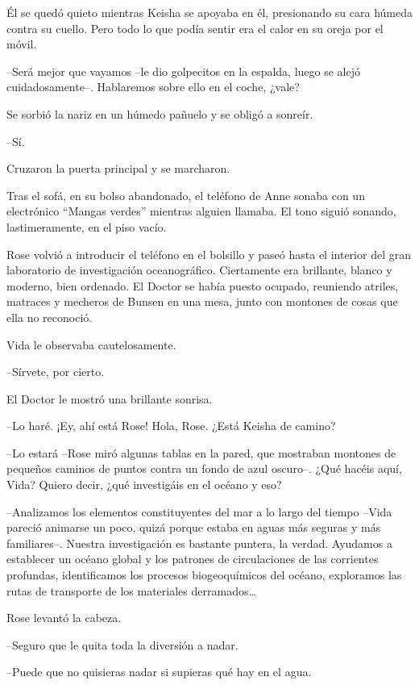 {Él se quedó quieto mientras Keisha se apoyaba en él, presionando su
 cara húmeda contra su cuello. Pero todo lo que podía sentir era el calor
en su oreja por el móvil.}

{--Será mejor que vayamos --le dio golpecitos en la espalda, luego se
alejó cuidadosamente--. Hablaremos sobre ello en el coche, ¿vale?}

{Se sorbió la nariz en un húmedo pañuelo y se obligó a sonreír.}

{--Sí.}

{Cruzaron la puerta principal y se marcharon.}

{Tras el sofá, en su bolso abandonado, el teléfono de Anne sonaba con un
 electrónico ``Mangas verdes'' mientras alguien llamaba. El tono siguió
sonando, lastimeramente, en el piso vacío.}

\mbox{}

{Rose volvió a introducir el teléfono en el bolsillo y paseó hasta el
 interior del gran laboratorio de investigación oceanográfico.
 Ciertamente era brillante, blanco y moderno, bien ordenado. El Doctor se
 había puesto ocupado, reuniendo atriles, matraces y mecheros de Bunsen
en una mesa, junto con montones de cosas que ella no reconoció.}

{Vida le observaba cautelosamente.}

{--Sírvete, por cierto.}

{El Doctor le mostró una brillante sonrisa.}

{--Lo haré. ¡Ey, ahí está Rose! Hola, Rose. ¿Está Keisha de camino?}

{--Lo estará --Rose miró algunas tablas en la pared, que mostraban
 montones de pequeños caminos de puntos contra un fondo de azul oscuro--.
 ¿Qué hacéis aquí, Vida? Quiero decir, ¿qué investigáis en el océano y
eso?}

{--Analizamos los elementos constituyentes del mar a lo largo del tiempo
 --Vida pareció animarse un poco, quizá porque estaba en aguas más
 seguras y más familiares--. Nuestra investigación es bastante puntera,
 la verdad. Ayudamos a establecer un océano global y los patrones de
 circulaciones de las corrientes profundas, identificamos los procesos
 biogeoquímicos del océano, exploramos las rutas de transporte de los
 materiales derramados\ldots{}}

{Rose levantó la cabeza.}

{--Seguro que le quita toda la diversión a nadar.}

{--Puede que no quisieras nadar si supieras qué hay en el agua.}

